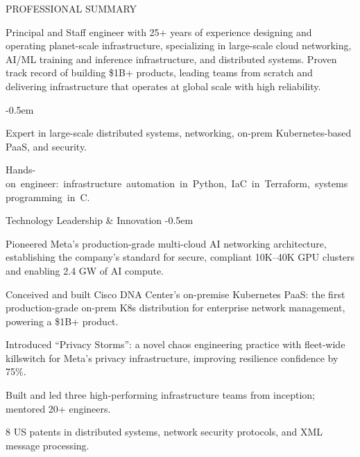 \documentclass{resume} %
\begin{document}

\begin{rSection}{PROFESSIONAL SUMMARY}

Principal and Staff engineer with 25+ years of experience designing and operating planet-scale infrastructure, specializing in large-scale cloud networking, AI/ML training and inference infrastructure, and
distributed systems. Proven track record of building \$1B+ products, leading teams from scratch 
and delivering infrastructure that operates at global scale with high reliability.
\begin{rSubsection}{}{}{}{}
{\vspace{-1.5em}}
\itemsep -0.5em
\item Expert in large-scale distributed systems,  networking, on-prem Kubernetes-based PaaS, and  security.
\item \mbox{Hands-on engineer: infrastructure automation in Python, IaC in Terraform, systems programming in C.}

\end{rSubsection}
\vspace{-.5em}

\begin{rSubsection}{Technology Leadership \& Innovation}{}{}{}
{\vspace{-2em}}\itemsep -0.5em
\item Pioneered Meta’s production-grade multi-cloud AI networking architecture, establishing the company’s standard for secure, compliant 10K–40K GPU clusters and enabling 2.4 GW of AI compute.
\item Conceived and built Cisco DNA Center’s on-premise Kubernetes PaaS: the first production-grade on-prem K8s distribution for enterprise network management, powering a \$1B+ product.
\item Introduced “Privacy Storms”: a novel chaos engineering practice with fleet-wide killswitch for Meta’s privacy infrastructure, improving resilience confidence by 75\%.
\item Built and led three high-performing infrastructure teams from inception; mentored 20+ engineers.
\item 8 US patents in distributed systems, network security protocols, and XML message processing.
\end{rSubsection}

\end{rSection}
\end{document}
